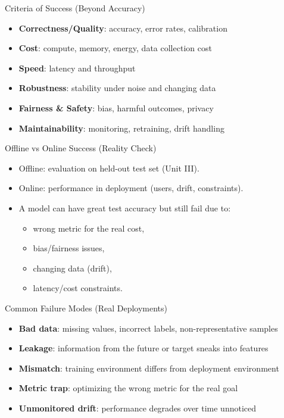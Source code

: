 \documentclass[aspectratio=169]{beamer}
\begin{document}
\begin{frame}{Criteria of Success (Beyond Accuracy)}
  \begin{itemize}[<+->]
    \item \textbf{Correctness/Quality}: accuracy, error rates, calibration
    \item \textbf{Cost}: compute, memory, energy, data collection cost
    \item \textbf{Speed}: latency and throughput
    \item \textbf{Robustness}: stability under noise and changing data
    \item \textbf{Fairness \& Safety}: bias, harmful outcomes, privacy
    \item \textbf{Maintainability}: monitoring, retraining, drift handling
  \end{itemize}
\end{frame}

\begin{frame}{Offline vs Online Success (Reality Check)}
  \begin{itemize}[<+->]
    \item Offline: evaluation on held-out test set (Unit III).
    \item Online: performance in deployment (users, drift, constraints).
    \item A model can have great test accuracy but still fail due to:
      \begin{itemize}
        \item wrong metric for the real cost,
        \item bias/fairness issues,
        \item changing data (drift),
        \item latency/cost constraints.
      \end{itemize}
  \end{itemize}
\end{frame}

\begin{frame}{Common Failure Modes (Real Deployments)}
  \begin{itemize}[<+->]
    \item \textbf{Bad data}: missing values, incorrect labels, non-representative samples
    \item \textbf{Leakage}: information from the future or target sneaks into features
    \item \textbf{Mismatch}: training environment differs from deployment environment
    \item \textbf{Metric trap}: optimizing the wrong metric for the real goal
    \item \textbf{Unmonitored drift}: performance degrades over time unnoticed
  \end{itemize}
\end{frame}
\end{document}
